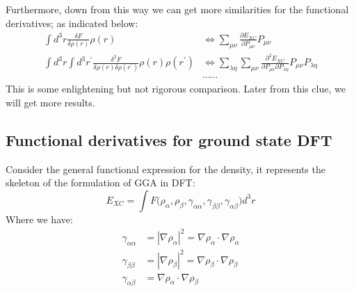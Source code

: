 Furthermore, down from this way we can get more similarities for the
functional derivatives; as indicated below:
\begin{equation}
 \label{minimization_density_vs_density_matrix_eq:5}
\begin{split}
 \int d^{3}r\frac{\delta F}{\delta\rho(r)}\rho(r) 
 &\Leftrightarrow
 \sum_{\mu\nu}\frac{\partial E_{XC}}{\partial P_{\mu\nu}}P_{\mu\nu}\\
 \int d^{3}r\int d^{3}r^{'}
 \frac{\delta^{2} F}
      {\delta\rho(r)\delta\rho(r^{'})}
       \rho(r)\rho(r^{'})
&\Leftrightarrow
 \sum_{\lambda\eta}\sum_{\mu\nu}
\frac{\partial^{2} E_{XC}}
     {\partial P_{\mu\nu}\partial
P_{\lambda\eta}}P_{\mu\nu}P_{\lambda\eta} \\
&\cdots\cdots
\end{split}
\end{equation}  
This is some enlightening but not rigorous comparison. Later from
this clue, we will get more results. 

\subsection{Functional derivatives for ground state DFT}
%
%
%
%
Consider the general functional expression for the density, it
represents the skeleton of the formulation of GGA in DFT:
\begin{equation}
  \label{eq:functional:34}
  E_{XC} = \int  F \Big(\rho_{\alpha}, \rho_{\beta},
  \gamma_{\alpha\alpha}, \gamma_{\beta\beta},
  \gamma_{\alpha\beta}\Big) d^{3}r
\end{equation}
Where we have:
\begin{align}
  \label{eq:functional:35}
  \gamma_{\alpha\alpha} &= |\nabla\rho_{\alpha}|^{2} =
\nabla\rho_{\alpha}\cdotp\nabla\rho_{\alpha}  \nonumber \\
  \gamma_{\beta\beta}  &= |\nabla\rho_{\beta}|^{2} = 
 \nabla\rho_{\beta}\cdotp\nabla\rho_{\beta}\nonumber \\
  \gamma_{\alpha\beta} &=\nabla\rho_{\alpha} \cdot \nabla\rho_{\beta}
\end{align}

